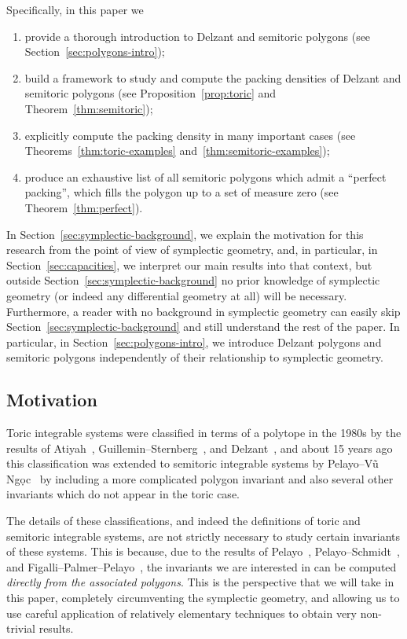 \documentclass[10pt,a4paper]{amsart}
\numberwithin{equation}{section}
\theoremstyle{definition}
\theoremstyle{plain}
\theoremstyle{plain}
\begin{document}
Specifically, in this paper we
\begin{enumerate}\itemsep=0pt
 \item[(1)] provide a thorough introduction to Delzant and semitoric polygons (see Section~\ref{sec:polygons-intro});
 \item[(2)] build a framework to study and compute the packing densities of Delzant and semitoric polygons (see Proposition~\ref{prop:toric} and Theorem~\ref{thm:semitoric});
 \item[(3)] explicitly compute the packing density in many important cases (see Theorems~\ref{thm:toric-examples} and~\ref{thm:semitoric-examples});
 \item[(4)] produce an exhaustive list of all semitoric polygons which admit a ``perfect packing'', which fills the polygon up to a set of measure zero (see Theorem~\ref{thm:perfect}).
\end{enumerate}
In Section~\ref{sec:symplectic-background}, we explain
the motivation for this research from the point of view of symplectic geometry, and, in particular, in Section~\ref{sec:capacities}, we interpret our main results into that context, but outside Section~\ref{sec:symplectic-background} no prior knowledge of symplectic geometry (or indeed any differential geometry at all) will be necessary.
Furthermore, a reader with no background in symplectic geometry can easily skip Section~\ref{sec:symplectic-background} and still understand the rest of the paper.
In particular, in Section~\ref{sec:polygons-intro}, we introduce Delzant polygons and semitoric polygons independently of their relationship to symplectic geometry.

\subsection{Motivation}
Toric integrable systems
were classified in terms of a polytope in the 1980s by the results of Atiyah~\cite{Atiyah}, Guillemin--Sternberg~\cite{GuSt1982}, and Delzant~\cite{De1988},
and about 15 years ago this classification was extended to semitoric integrable systems
by Pelayo--V\~{u} Ng\d{o}c~\cite{PeVN2009,PeVN2011} by including a more complicated polygon invariant and also several other invariants which do not appear in the toric case.

The details of these classifications, and indeed the definitions of toric and semitoric integrable systems, are not strictly necessary to study certain invariants of these systems.
This is because, due to the results of Pelayo~\cite{Pe2006, Pe2007}, Pelayo--Schmidt~\cite{PeSc2008}, and Figalli--Palmer--Pelayo~\cite{FiPaPe2016}, the invariants we are interested in can be computed \emph{directly from the associated polygons}.
This is the perspective that we will take in this paper, completely circumventing the symplectic geometry, and allowing us to use careful application of relatively elementary techniques to obtain very non-trivial results.
\end{document}
